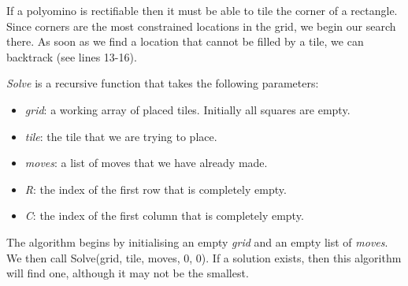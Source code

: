 \documentclass[10pt,a4paper]{article}
\theoremstyle{definition}
\begin{document}
If a polyomino is rectifiable then it must be able to tile the corner of a rectangle.
Since corners are the most constrained locations in the grid, we begin our search there.
As soon as we find a location that cannot be filled by a tile, we can backtrack (see lines 13-16).

\emph{Solve} is a recursive function that takes the following parameters:
\begin{itemize}
\item \emph{grid}: a working array of placed tiles. Initially all squares are empty.
\item \emph{tile}: the tile that we are trying to place.
\item \emph{moves}: a list of moves that we have already made.
\item \emph{R}: the index of the first row that is completely empty.
\item \emph{C}: the index of the first column that is completely empty.
\end{itemize}

The algorithm begins by initialising an empty  \emph{grid} and an empty list of \emph{moves}.
We then call Solve(grid, tile, moves, 0, 0). If a solution exists, then this algorithm will find one,
although it may not be the smallest.
\end{document}

